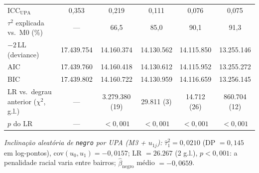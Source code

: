 \begin{table}[htbp]
{\begin{tabular}{lccccc}
ICC$_{\text{UPA}}$ & 0,353 & 0,219 & 0,111 & 0,076 & 0,075 \\
$\tau^2$ explicada vs.\ M0 (\%) & --- & 66,5 & 85,0 & 90,1 & 91,3 \\
$-2\,$LL (deviance) & 17.439.754 & 14.160.374 & 14.130.562 & 14.115.850 & 13.255.146 \\
AIC & 17.439.760 & 14.160.418 & 14.130.612 & 14.115.952 & 13.255.272 \\
BIC & 17.439.802 & 14.160.722 & 14.130.959 & 14.116.659 & 13.256.145 \\
LR vs.\ degrau anterior ($\chi^2$, g.l.) & --- & 3.279.380 (19) & 29.811 (3) & 14.712 (26) & 860.704 (12) \\
$p$ do LR & --- & $<0{,}001$ & $<0{,}001$ & $<0{,}001$ & $<0{,}001$ \\
\bottomrule
\end{tabular}}

\noindent\footnotesize\emph{Inclinação aleatória de \texttt{negro} por UPA (M3 + $u_{1j}$):} $\hat\tau^2_{1} = 0,0210$ (DP $= 0,145$ em log-pontos), cov$(u_0,u_1) = −0,0157$; LR $= 26.267$ (2 g.l.), $p<0{,}001$: a penalidade racial varia entre bairros; $\hat\beta_{\text{negro}}$ médio $= −0,0659$.
\normalsize
\end{table}
